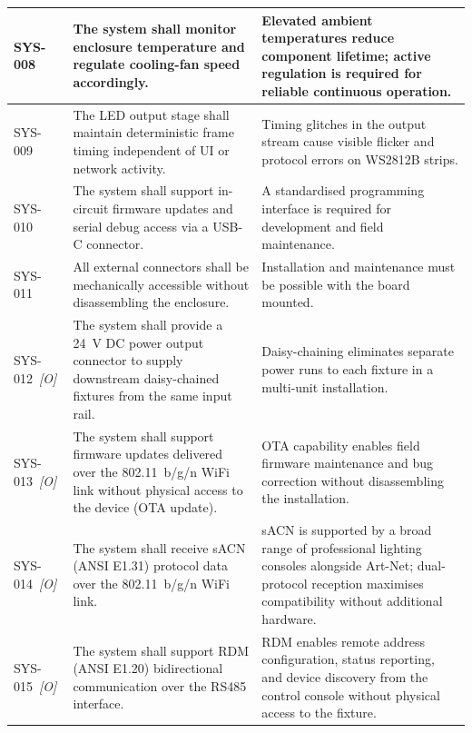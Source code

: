 \begin{longtable}{|p{1.8cm}|p{\dimexpr(\linewidth-1.8cm-6\tabcolsep-4\arrayrulewidth)/2\relax}|p{\dimexpr(\linewidth-1.8cm-6\tabcolsep-4\arrayrulewidth)/2\relax}|}
    \label{req:sys008}SYS-008 &
      The system shall monitor enclosure temperature and regulate cooling-fan speed accordingly. &
      Elevated ambient temperatures reduce component lifetime; active regulation is required for reliable continuous operation. \\ \hline
    \label{req:sys009}SYS-009 &
      The \ac{LED} output stage shall maintain deterministic frame timing independent of \ac{UI} or network activity. &
      Timing glitches in the output stream cause visible flicker and protocol errors on WS2812B strips. \\ \hline
    \label{req:sys010}SYS-010 &
      The system shall support in-circuit firmware updates and serial debug access via a \ac{USB}-C connector. &
      A standardised programming interface is required for development and field maintenance. \\ \hline
    \label{req:sys011}SYS-011 &
      All external connectors shall be mechanically accessible without disassembling the enclosure. &
      Installation and maintenance must be possible with the board mounted. \\ \hline
    \label{req:sys012}SYS-012~\textit{[O]} &
      The system shall provide a \SI{24}{\volt} \ac{DC} power output connector to supply downstream daisy-chained fixtures from the same input rail. &
      Daisy-chaining eliminates separate power runs to each fixture in a multi-unit installation. \\ \hline
    \label{req:sys013}SYS-013~\textit{[O]} &
      The system shall support firmware updates delivered over the 802.11~b/g/n \ac{WiFi} link without physical access to the device (\ac{OTA} update). &
      \ac{OTA} capability enables field firmware maintenance and bug correction without disassembling the installation. \\ \hline
    \label{req:sys014}SYS-014~\textit{[O]} &
      The system shall receive \ac{sACN} (ANSI E1.31) protocol data over the 802.11~b/g/n \ac{WiFi} link. &
      \ac{sACN} is supported by a broad range of professional lighting consoles alongside Art-Net; dual-protocol reception maximises compatibility without additional hardware. \\ \hline
    \label{req:sys015}SYS-015~\textit{[O]} &
      The system shall support \ac{RDM} (ANSI E1.20) bidirectional communication over the \ac{RS485} interface. &
      \ac{RDM} enables remote address configuration, status reporting, and device discovery from the control console without physical access to the fixture. \\ \hline

\end{longtable}
